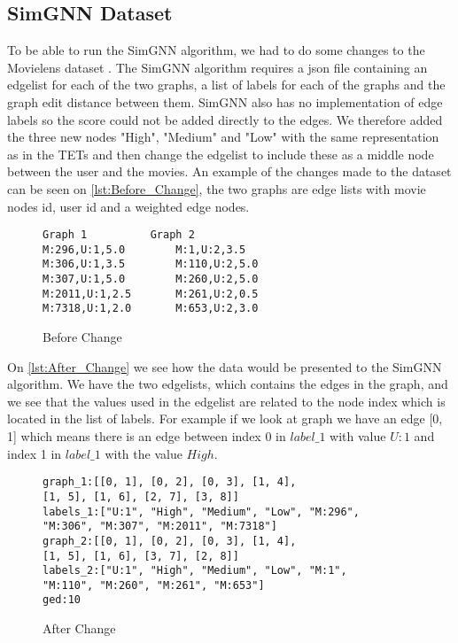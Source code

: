 \subsection{SimGNN Dataset}
To be able to run the SimGNN algorithm, we had to do some changes to the Movielens dataset \cite{Grouplensdata}. The SimGNN algorithm requires a json file containing an edgelist for each of the two graphs, a list of labels for each of the graphs and the graph edit distance between them. SimGNN also has no implementation of edge labels so the score could not be added directly to the edges. We therefore added the three new nodes "High", "Medium" and "Low" with the same representation as in the TETs and then change the edgelist to include these as a middle node between the user and the movies. 
An example of the changes made to the dataset can be seen on \autoref{lst:Before_Change}, the two graphs are edge lists with movie nodes id, user id and a weighted edge nodes. 
\begin{figure}
\begin{lstlisting}
Graph 1			 Graph 2
M:296,U:1,5.0		 M:1,U:2,3.5
M:306,U:1,3.5		 M:110,U:2,5.0
M:307,U:1,5.0		 M:260,U:2,5.0
M:2011,U:1,2.5 		 M:261,U:2,0.5
M:7318,U:1,2.0		 M:653,U:2,3.0
\end{lstlisting}
\caption{Before Change}
\label{lst:Before_Change}
\end{figure}
On \autoref{lst:After_Change} we see how the data would be presented to the SimGNN algorithm. We have the two edgelists, which contains the edges in the graph, and we see that the values used in the edgelist are related to the node index which is located in the list of labels. For example if we look at graph we have an edge [0, 1] which means there is an edge between index 0 in $label\_1$ with value $U:1$ and index 1 in $label\_1$ with the value  $High$.
\begin{figure}
\begin{lstlisting}
graph_1:[[0, 1], [0, 2], [0, 3], [1, 4], 
[1, 5], [1, 6], [2, 7], [3, 8]]
labels_1:["U:1", "High", "Medium", "Low", "M:296", 
"M:306", "M:307", "M:2011", "M:7318"]
graph_2:[[0, 1], [0, 2], [0, 3], [1, 4], 
[1, 5], [1, 6], [3, 7], [2, 8]]
labels_2:["U:1", "High", "Medium", "Low", "M:1",
"M:110", "M:260", "M:261", "M:653"]
ged:10
\end{lstlisting}
\caption{After Change}
\label{lst:After_Change}
\end{figure}
